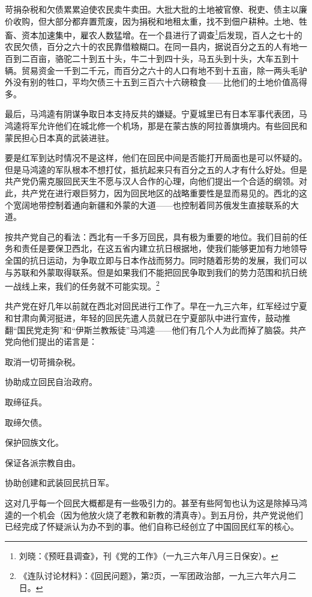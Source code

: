 \documentclass[10pt]{book}
\begin{document}
苛捐杂税和欠债累累迫使农民卖牛卖田。大批大批的土地被官僚、税吏、债主以廉价收购，但大部分都弃置荒废，因为捐税和地租太重，找不到佃户耕种。土地、牲畜、资本加速集中，雇农人数猛增。在一个县进行了调查\footnote{刘晓：《预旺县调查》，刊《党的工作》（一九三六年八月三日保安）。}后发现，百人之七十的农民欠债，百分之六十的农民靠借粮糊口。在同一县内，据说百分之五的人有地一百到二百亩，骆驼二十到五十头，牛二十到四十头，马五头到十头，大车五到十辆。贸易资金一千到二千元，而百分之六十的人口有地不到十五亩，除一两头毛驴外没有别的牲口，平均欠债三十五到三百六十六磅粮食——比他们的土地价值高得多。

最后，马鸿逵有阴谋争取日本支持反共的嫌疑。宁夏城里已有日本军事代表团，马鸿逵将军允许他们在城北修一个机场，那是在蒙古族的阿拉善旗境内。有些回民和蒙民担心日本真的武装进驻。

要是红军到达时情况不是这样，他们在回民中间是否能打开局面也是可以怀疑的。但是马鸿逵的军队根本不想打仗，抵抗起来只有百分之五的人才有什么好处。但是共产党仍需克服回民天生不愿与汉人合作的心理，向他们提出一个合适的纲领。对此，共产党在进行艰巨努力，因为回民地区的战略重要性是显而易见的。西北的这个宽阔地带控制着通向新疆和外蒙的大道——也控制着同苏俄发生直接联系的大道。

按共产党自己的看法：西北有一千多万回民，具有极为重要的地位。我们目前的任务和责任是要保卫西北，在这五省内建立抗日根据地，使我们能够更加有力地领导全国的抗日运动，为争取立即与日本作战而努力。同时随着形势的发展，我们可以与苏联和外蒙取得联系。但是如果我们不能把回民争取到我们的势力范围和抗日统一战线上来，我们的任务就不可能实现。\footnote{《连队讨论材料》：《回民问题》，第2页，一军团政治部，一九三六年六月二日。}

共产党在好几年以前就在西北对回民进行工作了。早在一九三六年，红军经过宁夏和甘肃向黄河挺进，年轻的回民先遣人员就已在宁夏部队中进行宣传，鼓动推翻“国民党走狗”和“伊斯兰教叛徒”马鸿逵——他们有几个人为此而掉了脑袋。共产党向他们提出的诺言是：

取消一切苛揖杂税。

协助成立回民自治政府。

取缔征兵。

取缔欠债。

保护回族文化。

保证各派宗教自由。

协助创建和武装回民抗日军。

这对几乎每一个回民大概都是有一些吸引力的。甚至有些阿訇也认为这是除掉马鸿逵的一个机会（因为他放火烧了老教和新教的清真寺）。到五月份，共产党说他们已经完成了怀疑派认为办不到的事。他们自称已经创立了中国回民红军的核心。
\end{document}
